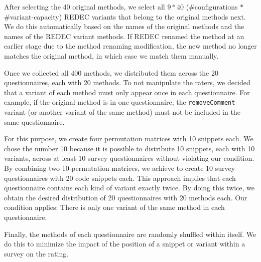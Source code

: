 \documentclass[%
class=scrreprt,
chapterprefix=false,%
open=right,%
twoside=true,%
paper=a4,%
logofile={Logo\_zentral\_farbig\_EN.png},%
thesistype=master,%
UKenglish,%
]{se2thesis}
\theoremstyle{definition}
\newcommand{\mod}{modification\xspace}
\newcommand{\rdh}{REDEC\xspace}
\begin{document}
	After selecting the 40 original methods, we select all $9*40$ (\#configurations $*$ \#variant-capacity) \rdh variants that belong to the original methods next. We do this automatically based on the names of the original methods and the names of the \rdh variant methods. If \rdh renamed the method at an earlier stage due to the method renaming \mod, the new method no longer matches the original method, in which case we match them manually.
		
	Once we collected all 400 methods, we distributed them across the 20 questionnaires, each with 20 methods. To not manipulate the raters, we decided that a variant of each method must only appear once in each questionnaire. For example, if the original method is in one questionnaire, the \texttt{removeComment} variant (or another variant of the same method) must not be included in the same questionnaire.
		
	For this purpose, we create four permutation matrices with 10 snippets each. We chose the number 10 because it is possible to distribute 10 snippets, each with 10 variants, across at least 10 survey questionnaires without violating our condition. By combining two 10-permutation matrices, we achieve to create 10 survey questionnaires with 20 code snippets each. This approach implies that each questionnaire contains each kind of variant exactly twice. By doing this twice, we obtain the desired distribution of 20 questionnaires with 20 methods each. Our condition applies: There is only one variant of the same method in each questionnaire.
		
	Finally, the methods of each questionnaire are randomly shuffled within itself. We do this to minimize the impact of the position of a snippet or variant within a survey on the rating.

	
\end{document}
